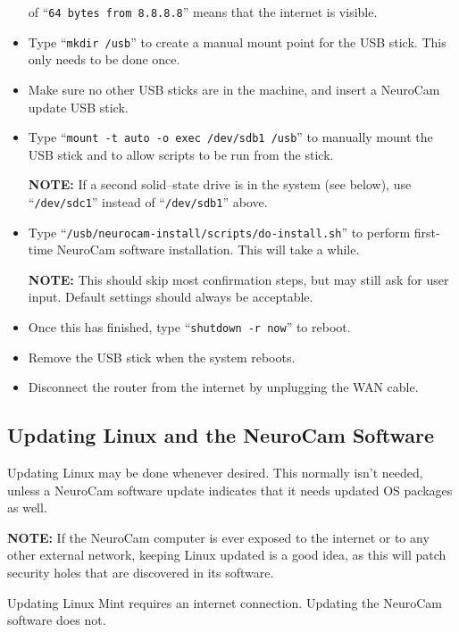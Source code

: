 \begin{itemize}
of ``\verb+64 bytes from 8.8.8.8+'' means that the internet is visible.
\item Type ``\verb+mkdir /usb+'' to create a manual mount point for the USB
stick. This only needs to be done once.
\item Make sure no other USB sticks are in the machine, and insert a
NeuroCam update USB stick.
\item Type ``\verb+mount -t auto -o exec /dev/sdb1 /usb+'' to manually mount
the USB stick and to allow scripts to be run from the stick.
\par
\textbf{NOTE:} If a second solid--state drive is in the system (see below),
use ``\verb+/dev/sdc1+'' instead of ``\verb+/dev/sdb1+'' above.
\item Type ``\verb+/usb/neurocam-install/scripts/do-install.sh+'' to perform
first-time NeuroCam software installation. This will take a while.
\par
\textbf{NOTE:} This should skip most confirmation steps, but may still ask for
user input. Default settings should always be acceptable.
\item Once this has finished, type ``\verb+shutdown -r now+'' to reboot.
\item Remove the USB stick when the system reboots.
\item Disconnect the router from the internet by unplugging the WAN cable.
%
\end{itemize}

%
\subsection{Updating Linux and the NeuroCam Software}

Updating Linux may be done whenever desired. This normally isn't needed,
unless a NeuroCam software update indicates that it needs updated OS
packages as well.

\textbf{NOTE:} If the NeuroCam computer is ever exposed to the internet or
to any other external network, keeping Linux updated is a good idea, as this
will patch security holes that are discovered in its software.

Updating Linux Mint requires an internet connection. Updating the NeuroCam
software does not.

